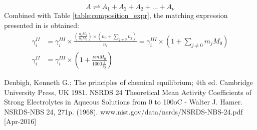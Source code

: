 \documentclass[onecolumn]{article}
\begin{document}
\[
A \rightleftharpoons A_1 + A_2 + A_2 + ... + A_{\nu}
\]
Combined with Table \ref{table:composition_expr}, the matching expression presented in \cite{Hamer1968} is obtained:
\[
\begin{aligned}
\gamma_i^{II} & =  \gamma_i^{III} \times \frac{\left( \frac{n_i M_0}{n_0 M_0}\right) \times (n_0 + \sum_{j\neq0}{n_j}) }{n_i} = \gamma_i^{III} \times \left(1+\sum_{j\neq0}{m_j M_0} \right) \\ 
\gamma_i^{II} & = \gamma_i^{III} \times \left(1+\frac{\nu m M_0}{1000 \frac{g}{kg}} \right)
\end{aligned}
\]
 \begin{thebibliography}{9}
  Denbigh, Kenneth G.; The principles of chemical equilibrium; 4th ed. Cambridge University Press, UK 1981.
  NSRDS 24 Theoretical Mean Activity Coefficients of Strong Electrolytes in Aqueous Solutions from 0 to 100oC - Walter J. Hamer. NSRDS-NBS 24, 271p. (1968). www.nist.gov/data/nsrds/NSRDS-NBS-24.pdf [Apr-2016]
 \end{thebibliography}
\end{document}

